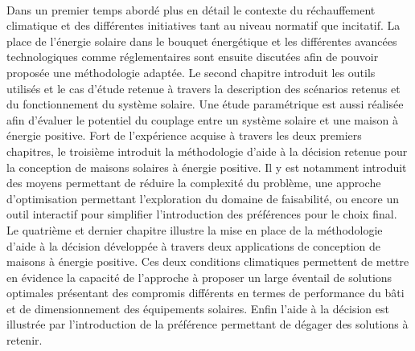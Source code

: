 \paragraph{} %
Dans un premier temps abordé plus en détail le contexte du réchauffement
climatique et des différentes initiatives tant au niveau normatif que incitatif. La place
de l’énergie solaire dans le bouquet énergétique et les différentes avancées technologiques
comme réglementaires sont ensuite discutées afin de pouvoir proposée une méthodologie
adaptée. Le second chapitre introduit les outils utilisés et le cas d’étude retenue à
travers la description des scénarios retenus et du fonctionnement du système solaire. Une
étude paramétrique est aussi réalisée afin d’évaluer le potentiel du couplage entre un
système solaire et une maison à énergie positive. Fort de l’expérience acquise à travers
les deux premiers chapitres, le troisième introduit la méthodologie d’aide à la décision
retenue pour la conception de maisons solaires à énergie positive. Il y est notamment
introduit des moyens permettant de réduire la complexité du problème, une approche
d’optimisation permettant l’exploration du domaine de faisabilité, ou encore un outil
interactif pour simplifier l’introduction des préférences pour le choix final. Le
quatrième et dernier chapitre illustre la mise en place de la méthodologie d’aide à la
décision développée à travers deux applications de conception de maisons à énergie
positive. Ces deux conditions climatiques permettent de mettre en évidence la capacité de
l’approche à proposer un large éventail de solutions optimales présentant des compromis
différents en termes de performance du bâti et de dimensionnement des équipements
solaires. Enfin l’aide à la décision est illustrée par l’introduction de la préférence
permettant de dégager des solutions à retenir.
